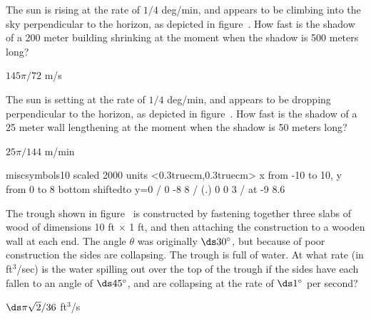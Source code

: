 \begin{exercises}
\begin{exercise}
The sun is rising at the rate of $1/4$ deg/min, and appears to be
climbing into the sky perpendicular to the
horizon, as depicted in figure~.
How fast is the shadow of a 200 meter building
shrinking at the moment when the shadow is 500 meters long? 
\begin{answer} $145\pi/72$ m/s
\end{answer}\end{exercise}

\begin{exercise} The sun is setting at the rate of $1/4$ deg/min, and appears
to be dropping perpendicular to the horizon, as depicted in
figure~. How fast is the shadow of a 25
meter wall lengthening at the moment when the shadow is 50 meters long?
\begin{answer} $25\pi/144$ m/min
\end{answer}\end{exercise}

\font\miscsymbols miscsymbols10 scaled 2000
\figure
\vbox{\beginpicture
\normalgraphs
\sevenpoint
\setcoordinatesystem units <0.3truecm,0.3truecm>
\setplotarea x from -10 to 10, y from 0 to 8
\axis bottom shiftedto y=0 /
\setdashes\setlinear
{} 0 -8 8 /
\setsolid
\setplotsymbol ({\tenrm.}) 
 0 0 3 /
 at -9 8.6
\endpicture}



\begin{exercise}
The trough shown in figure~
is constructed by fastening together three
slabs of wood of dimensions 10 ft $\times$ 1 ft, and then attaching the
construction to a wooden wall at each end.  The angle $\theta$ was
originally $\ds 30^\circ$, but because of poor construction the sides are
collapsing.  The trough is full of water.  At what rate (in ft${}^3$/sec) 
is 
the water spilling out over the top of
the trough if the sides have each fallen to an angle of $\ds 45^\circ$, and are
collapsing at the rate of $\ds 1^\circ$ per second?
\begin{answer} $\ds \pi\sqrt2/36$ ft$^3$/s
\end{answer}\end{exercise}


\end{exercises}
